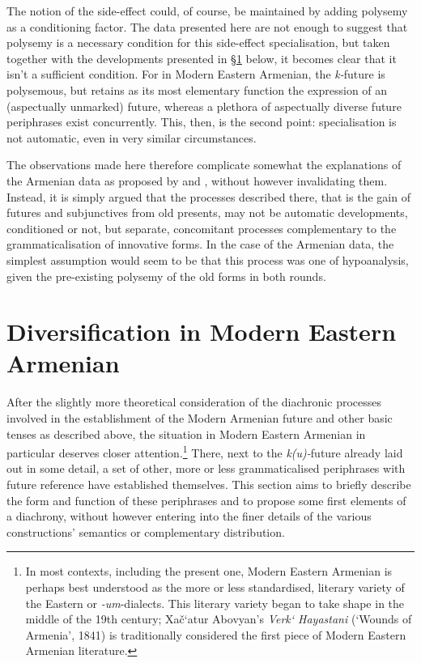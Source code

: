 \documentclass[output=paper,colorlinks,citecolor=brown]{langscibook}
\begin{document}
The notion of the side-effect could, of course, be maintained by adding polysemy as a conditioning factor. The data presented here are not enough to suggest that polysemy is a necessary condition for this side-effect specialisation, but taken together with the developments presented in §\ref{sec:meyer:modarm} below, it becomes clear that it isn't a sufficient condition. For in Modern Eastern Armenian, the \textit{k-}future is polysemous, but retains as its most elementary function the expression of an (aspectually unmarked) future, whereas a plethora of aspectually diverse future periphrases exist concurrently. This, then, is the second point: specialisation is not automatic, even in very similar circumstances.

The observations made here therefore complicate somewhat the explanations of the Armenian data as proposed by \citet{Haspelmath1998a} and \citet{BybeePerkinsPagliuca1994}, without however invalidating them. Instead, it is simply argued that the processes described there, that is the gain of futures and subjunctives from old presents, may not be automatic developments, conditioned or not, but separate, concomitant processes complementary to the grammaticalisation of innovative forms. In the case of the Armenian data, the simplest assumption would seem to be that this process was one of hypoanalysis, given the pre-existing polysemy of the old forms in both rounds.


	\section{Diversification in Modern Eastern Armenian}\label{sec:meyer:modarm}
After the slightly more theoretical consideration of the diachronic processes involved in the establishment of the Modern Armenian future and other basic tenses as described above, the situation in Modern Eastern Armenian in particular deserves closer attention.\footnote{In most contexts, including the present one, Modern Eastern Armenian is perhaps best understood as the more or less standardised, literary variety of the Eastern or  \textit{-um}-dialects. This literary variety began to take shape in the middle of the 19th century; Xač‘atur Abovyan's \textit{Verk‘ Hayastani} (‘Wounds of Armenia’, 1841) is traditionally considered the first piece of Modern Eastern Armenian literature.} There, next to the \textit{k(u)-}future already laid out in some detail, a set of other, more or less grammaticalised periphrases with future reference have established themselves. This section aims to briefly describe the form and function of these periphrases and to propose some first elements of a diachrony, without however entering into the finer details of the various constructions' semantics or complementary distribution.
\end{document}
